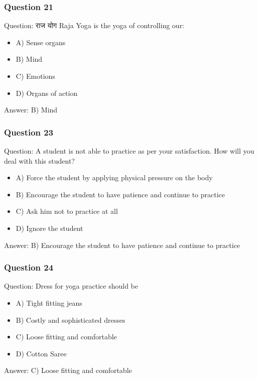 \begin{frame}[fragile]\frametitle{Question 21}
Question: राज योग Raja Yoga is the yoga of controlling our:
\begin{itemize}
\item A) Sense organs
\item B) Mind
\item C) Emotions
\item D) Organs of action
\end{itemize}
Answer: B) Mind
\end{frame}



\begin{frame}[fragile]\frametitle{Question 23}
Question: A student is not able to practice as per your satisfaction. How will you deal with this student?
\begin{itemize}
\item A) Force the student by applying physical pressure on the body
\item B) Encourage the student to have patience and continue to practice
\item C) Ask him not to practice at all
\item D) Ignore the student
\end{itemize}
Answer: B) Encourage the student to have patience and continue to practice
\end{frame}

\begin{frame}[fragile]\frametitle{Question 24}
Question: Dress for yoga practice should be
\begin{itemize}
\item A) Tight fitting jeans
\item B) Costly and sophisticated dresses
\item C) Loose fitting and comfortable
\item D) Cotton Saree
\end{itemize}
Answer: C) Loose fitting and comfortable
\end{frame}

